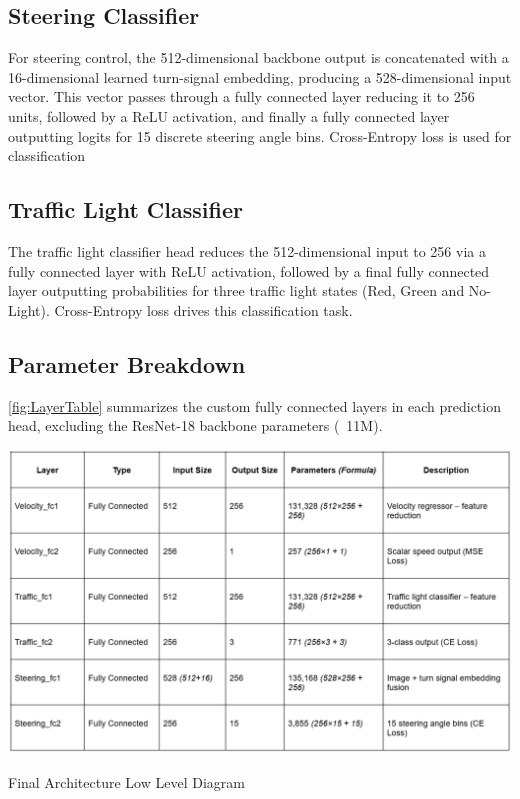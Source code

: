 \documentclass{article} %
\begin{document}
\subsection{Steering Classifier}
For steering control, the 512-dimensional backbone output is concatenated with a 16-dimensional learned turn-signal embedding, producing a 528-dimensional input vector.
This vector passes through a fully connected layer reducing it to 256 units, followed by a ReLU activation, and finally a fully connected layer outputting logits for 15 discrete steering angle bins.
Cross-Entropy loss is used for classification

\subsection{Traffic Light Classifier}

The traffic light classifier head reduces the 512-dimensional input to 256 via a fully connected layer with ReLU activation, followed by a final fully connected layer outputting probabilities for three traffic light states (Red, Green and No-Light).
Cross-Entropy loss drives this classification task.

\subsection{Parameter Breakdown}

\autoref{fig:LayerTable} summarizes the custom fully connected layers in each prediction head, excluding the ResNet-18 backbone parameters (~11M).

\begin{table}[H] %
    \centering
    \includegraphics[width=1.0\textwidth]{LayerTable.png} %
    \caption{Final Architecture Low Level Diagram}
    \label{fig:LayerTable}
\end{table}
\end{document}
